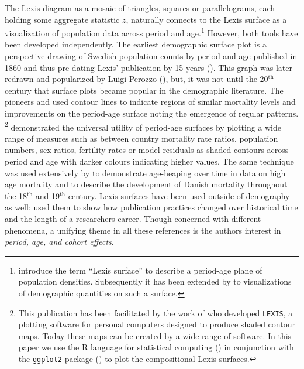 \documentclass[parskip=half]{scrartcl}
\begin{document}
The Lexis diagram as a mosaic of triangles, squares or parallelograms, each holding some aggregate statistic $z$, naturally connects to the Lexis surface as a visualization of population data across period and age.\footnote{
  \textcite{Arthur1984} introduce the term \enquote{Lexis surface} to describe a period-age plane of population densities. Subsequently it has been extended by \textcite{Vaupel1987a} to visualizations of demographic quantities on such a surface.
}
However, both tools have been developed independently. The earliest demographic surface plot is a perspective drawing of Swedish population counts by period and age published in 1860 and thus pre-dating Lexis' publication by 15 years (\cite{Caselli1990}). This graph was later redrawn and popularized by Luigi Perozzo (\cite{Perozzo1880}), but, it was not until the 20$^\text{th}$ century that surface plots became popular in the demographic literature. The pioneers \textcite{Kermack2001} and \textcite{Delaporte1942} used contour lines to indicate regions of similar mortality levels and improvements on the period-age surface noting the emergence of regular patterns. \textcite{Vaupel1987a}\footnote{
  This publication has been facilitated by the work of \textcite{Gambill1985} who developed \texttt{LEXIS}, a plotting software for personal computers designed to produce shaded contour maps. Today these maps can be created by a wide range of software. In this paper we use the R language for statistical computing (\cite{R2016}) in conjunction with the \texttt{ggplot2} package (\cite{Wickham2016}) to plot the compositional Lexis surfaces.
} demonstrated the universal utility of period-age surfaces by plotting a wide range of measures such as between country mortality rate ratios, population numbers, sex ratios, fertility rates or model residuals as shaded contours across period and age with darker colours indicating higher values. The same technique was used extensively by \textcite{Andreev1999} to demonstrate age-heaping over time in data on high age mortality and to describe the development of Danish mortality throughout the 18$^\text{th}$ and 19$^\text{th}$ century. Lexis surfaces have been used outside of demography as well: \textcite{Sula2012} used them to show how publication practices changed over historical time and the length of a researchers career. Though concerned with different phenomena, a unifying theme in all these references is the authors interest in \emph{period, age, and cohort effects}.
\end{document}
